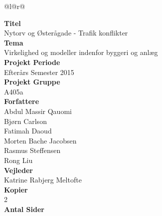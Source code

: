 \begin{nopagebreak}
	{\begin{center}
			\begin{tabular*}{\textwidth}{@{}l@{\extracolsep{\fill}}r@{}}
				\\
				\begin{minipage}[t]{0.49\textwidth}
					\textbf{Titel}\\
					Nytorv og Østerågade - Trafik konflikter\\
					
					\textbf{Tema}\\
					Virkelighed og modeller indenfor byggeri og anlæg\\
					
					\textbf{Projekt Periode}\\
					Efterårs Semester 2015\\
					
					\textbf{Projekt Gruppe}\\
					A405a\\
					
					\textbf{Forfattere}\\
					Abdul Massir Qauomi\\
					Bjørn Carlson\\
					Fatimah Daoud\\
					Morten Bache Jacobsen\\
					Rasmus Steffensen\\
					Rong Liu\\
					
					\textbf{Vejleder}\\
					Katrine Rabjerg Meltofte\\
					
					\textbf{Kopier}\\
					2\\ %
					
					\textbf{Antal Sider}\\
					\pageref{LastPage}\\
					

\end{minipage}
\end{tabular*}
\end{center}}
\end{nopagebreak}
